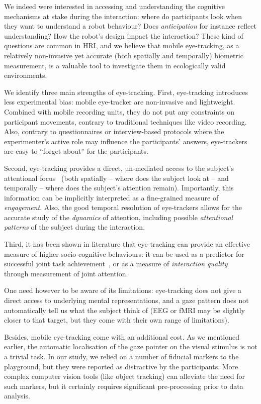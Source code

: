 \documentclass{sig-alternate}
\begin{document}
We indeed were interested in accessing and understanding the cognitive
mechanisms at stake during the interaction: where do participants look when they
want to understand a robot behaviour? Does \emph{anticipation} for instance
reflect understanding? How the robot's design impact the interaction? These kind
of questions are common in HRI, and we believe that mobile eye-tracking, as a
relatively non-invasive yet accurate (both spatially and temporally) biometric
measurement, is a valuable tool to investigate them in ecologically
valid environments.

We identify three main strengths of eye-tracking. First, eye-tracking introduces
less experimental bias: mobile eye-tracker are non-invasive and lightweight.
Combined with mobile recording units, they do not put any constraints on
participant movements, contrary to traditional techniques like video recording.
Also, contrary to questionnaires or interview-based protocols where the
experimenter's active role may influence the participants' answers, eye-trackers
are easy to ``forget about'' for the participants.

Second, eye-tracking provides a direct, un-mediated access to the subject's
attentional focus~\cite{sharma2014withmeness} (both spatially -- where does the
subject look at -- and temporally -- where does the subject's attention remain).
Importantly, this information can be implicitly interpreted as a fine-grained measure of
\emph{engagement}.  Also, the good temporal resolution of eye-trackers allows
for the accurate study of the \emph{dynamics} of attention, including possible
\emph{attentional patterns} of the subject during the interaction.

Third, it has been shown in literature that eye-tracking can provide an
effective measure of higher socio-cognitive behaviours: it can be used as a
predictor for successful joint task achievement~\cite{sharma2013understanding},
or as a measure of \emph{interaction quality}~\cite{jermann2012effects} through
measurement of joint attention.

One need however to be aware of its limitations: eye-tracking does not give a direct
access to underlying mental representations, and a gaze pattern does not
automatically tell us what the subject think of (EEG or fMRI may be slightly
closer to that target, but they come with their own range of limitations).

Besides, mobile eye-tracking come with an additional cost. As we mentioned
earlier, the automatic localisation of the gaze pointer on the visual stimulus
is not a trivial task. In our study, we relied on a number of fiducial markers
to the playground, but they were reported as distractive by the participants.
More complex computer vision tools (like object tracking) can alleviate the need
for such markers, but it certainly requires significant pre-processing prior to
data analysis.
\end{document}
